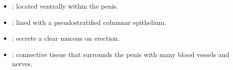 \begin{multicols}{2}
\begin{itemize}
  \begin{center}
  \end{center}
  
  \item {}: located ventrally within the penis.
  
  \begin{center}
  \end{center}
  
  \item {}: lined with a pseudostratified columnar epithelium.
  
  \begin{center}
  \end{center}
  
  \item {}:  secrete a clear mucous on erection.
  
  \begin{center}
  \end{center}
  
  \item {}: connective tissue that surrounds the penis with many blood vessels and nerves.
  
  \begin{center}
  \end{center}
  
\end{itemize}
\end{multicols}

